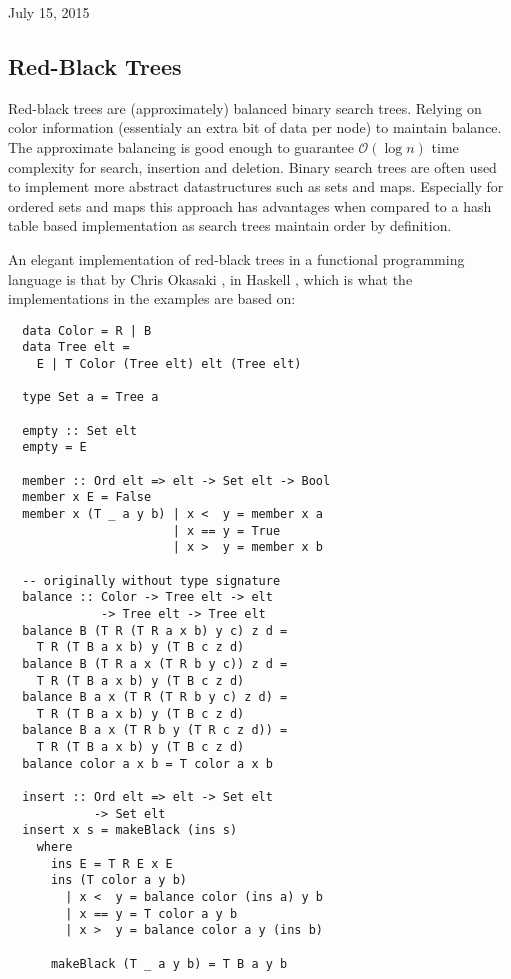 \documentclass[journal, retainorgcmds]{../IEEEtemplate/IEEEtran}
\begin{document}
\hfill July 15, 2015

\subsection{Red-Black Trees}

Red-black trees are (approximately) balanced binary search trees.
Relying on color information (essentialy an extra bit of data per node) to
maintain balance.
The approximate balancing is good enough to guarantee $\mathcal{O}(\log{}n)$
time complexity for search, insertion and deletion.
Binary search trees are often used to implement more abstract datastructures
such as sets and maps.
Especially for ordered sets and maps this approach has advantages when compared
to a hash table based implementation as search trees maintain order by
definition.

An elegant implementation of red-black trees in a functional programming
language is that by Chris Okasaki \cite{okasaki}, in Haskell \cite{haskell},
which is what the implementations in the examples are based on:

\begin{verbatim}
  data Color = R | B
  data Tree elt =
    E | T Color (Tree elt) elt (Tree elt)

  type Set a = Tree a

  empty :: Set elt
  empty = E

  member :: Ord elt => elt -> Set elt -> Bool
  member x E = False
  member x (T _ a y b) | x <  y = member x a
                       | x == y = True
                       | x >  y = member x b

  -- originally without type signature
  balance :: Color -> Tree elt -> elt
             -> Tree elt -> Tree elt
  balance B (T R (T R a x b) y c) z d =
    T R (T B a x b) y (T B c z d)
  balance B (T R a x (T R b y c)) z d =
    T R (T B a x b) y (T B c z d)
  balance B a x (T R (T R b y c) z d) =
    T R (T B a x b) y (T B c z d)
  balance B a x (T R b y (T R c z d)) =
    T R (T B a x b) y (T B c z d)
  balance color a x b = T color a x b

  insert :: Ord elt => elt -> Set elt
            -> Set elt
  insert x s = makeBlack (ins s)
    where
      ins E = T R E x E
      ins (T color a y b)
        | x <  y = balance color (ins a) y b
        | x == y = T color a y b
        | x >  y = balance color a y (ins b)

      makeBlack (T _ a y b) = T B a y b
\end{verbatim}
\end{document}
